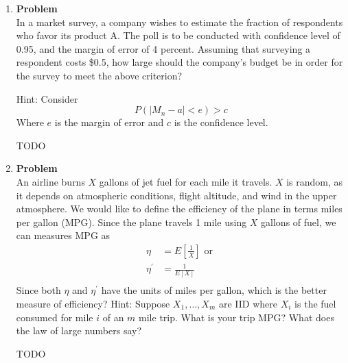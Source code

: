 \documentclass[12pt]{article}
\newenvironment{Ex}{\textbf{Problem}\vspace{.75em}\\}{}
\begin{document}
\begin{enumerate}
\item
  \begin{Ex}
    In a market survey, a company wishes to estimate the fraction of
    respondents who favor its product A. The poll is to be conducted
    with confidence level of 0.95, and the margin of error of 4
    percent. Assuming that surveying a respondent costs \$0.5, how
    large should the company's budget be in order for the survey to
    meet the above criterion?

    Hint: Consider
    \begin{equation}
      \label{eq:5-hint}
      P(|M_n-a|<e)>c
    \end{equation}
    Where $e$ is the margin of error and $c$ is the confidence level.
    \begin{solution} \hfill
      {\color{red} \huge TODO}
    \end{solution}
  \end{Ex}

\item
  \begin{Ex}
    An airline burns $X$ gallons of jet fuel for each mile it travels. $X$
    is random, as it depends on atmospheric conditions, flight
    altitude, and wind in the upper atmosphere. We would like to
    define the efficiency of the plane in terms miles per gallon
    (MPG). Since the plane travels 1 mile using $X$ gallons of fuel, we
    can measures MPG as
    \begin{equation}
      \label{eq:6-mpg}
      \begin{aligned}
        \eta &= E\left[\frac{1}{X}\right] \text{ or } \\
        \eta^\prime &= \frac{1}{E[X]} \\
      \end{aligned}
    \end{equation}
    Since both $\eta$ and $\eta^\prime$ have the units of miles per gallon,
    which is the better measure of efficiency? Hint: Suppose
    $X_1,\ldots,X_m$ are IID where $X_i$ is the fuel consumed for mile
    $i$ of an $m$ mile trip. What is your trip MPG? What does the law
    of large numbers say?
    \begin{solution} \hfill
      {\color{red} \huge TODO}
    \end{solution}
  \end{Ex}


\end{enumerate}
\end{document}
